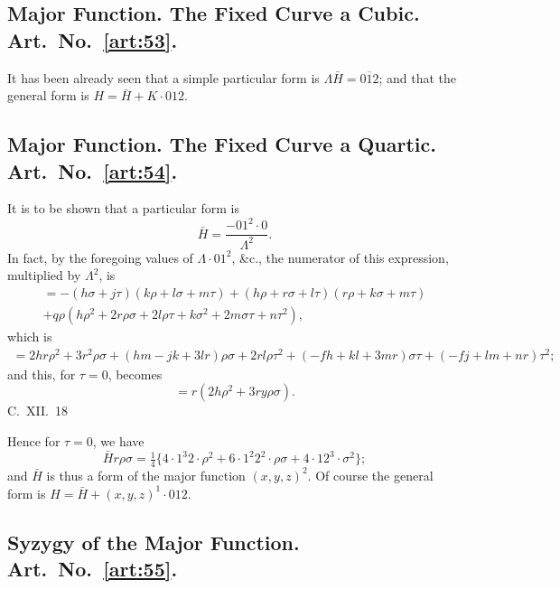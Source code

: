 \documentclass[11pt,a4paper]{book}
\begin{document}
\subsection*{Major Function. The Fixed Curve a Cubic. Art.~No.~\ref{art:53}.}

\begin{art}\label{art:53}
It has been already seen that a simple particular form is $\Lambda\bar{H} = \overline{012}$; and that the general form is $H = \bar{H} + K \cdot 012$.
\end{art}

\subsection*{Major Function. The Fixed Curve a Quartic. Art.~No.~\ref{art:54}.}

\begin{art}\label{art:54}
It is to be shown that a particular form is
\[
\bar{H} = \frac{-01^2 \cdot 0}{\Lambda^2}.
\]
In fact, by the foregoing values of $\Lambda \cdot 01^2$, \&c., the numerator of this expression, multiplied by $\Lambda^2$, is
\begin{multline*}
= -(h\sigma + j\tau)(k\rho + l\sigma + m\tau) + (h\rho + r\sigma + l\tau)(r\rho + k\sigma + m\tau) \\
+ q\rho(h\rho^2 + 2r\rho\sigma + 2l\rho\tau + k\sigma^2 + 2m\sigma\tau + n\tau^2),
\end{multline*}
which is
\begin{multline*}
= 2hr\rho^2 + 3r^2\rho\sigma + (hm - jk + 3lr)\rho\sigma + 2rl\rho\tau^2 + (-fh + kl + 3mr)\sigma\tau + (-fj + lm + nr)\tau^2;
\end{multline*}
and this, for $\tau = 0$, becomes
\[
= r(2h\rho^2 + 3ry\rho\sigma).
\]
C.~XII.~18
\end{art}

\newpage
Hence for $\tau = 0$, we have
\[
\bar{H}r\rho\sigma = \tfrac{1}{4}\{4 \cdot 1^3 2 \cdot \rho^2 + 6 \cdot 1^2 2^2 \cdot \rho\sigma + 4 \cdot 12^3 \cdot \sigma^2\};
\]
and $\bar{H}$ is thus a form of the major function $(x, y, z)^2$. Of course the general form is $H = \bar{H} + (x, y, z)^1 \cdot 012$.

\subsection*{Syzygy of the Major Function. Art.~No.~\ref{art:55}.}
\end{document}
